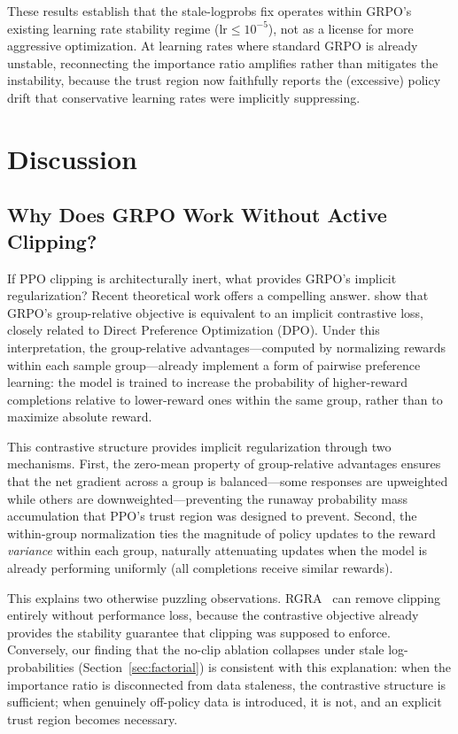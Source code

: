 These results establish that the stale-logprobs fix operates within GRPO's existing learning rate stability regime ($\text{lr} \leq 10^{-5}$), not as a license for more aggressive optimization.
At learning rates where standard GRPO is already unstable, reconnecting the importance ratio amplifies rather than mitigates the instability, because the trust region now faithfully reports the (excessive) policy drift that conservative learning rates were implicitly suppressing.


\section{Discussion}
\label{sec:discussion}

\subsection{Why Does GRPO Work Without Active Clipping?}
\label{sec:why-grpo-works}

If PPO clipping is architecturally inert, what provides GRPO's implicit regularization?
Recent theoretical work offers a compelling answer.
\citet{grpo-dpo2025} show that GRPO's group-relative objective is equivalent to an implicit contrastive loss, closely related to Direct Preference Optimization (DPO).
Under this interpretation, the group-relative advantages---computed by normalizing rewards within each sample group---already implement a form of pairwise preference learning: the model is trained to increase the probability of higher-reward completions relative to lower-reward ones within the same group, rather than to maximize absolute reward.

This contrastive structure provides implicit regularization through two mechanisms.
First, the zero-mean property of group-relative advantages ensures that the net gradient across a group is balanced---some responses are upweighted while others are downweighted---preventing the runaway probability mass accumulation that PPO's trust region was designed to prevent.
Second, the within-group normalization ties the magnitude of policy updates to the reward \emph{variance} within each group, naturally attenuating updates when the model is already performing uniformly (all completions receive similar rewards).

This explains two otherwise puzzling observations.
RGRA~\citep{rgra2025} can remove clipping entirely without performance loss, because the contrastive objective already provides the stability guarantee that clipping was supposed to enforce.
Conversely, our finding that the no-clip ablation collapses under stale log-probabilities (Section~\ref{sec:factorial}) is consistent with this explanation: when the importance ratio is disconnected from data staleness, the contrastive structure is sufficient; when genuinely off-policy data is introduced, it is not, and an explicit trust region becomes necessary.

